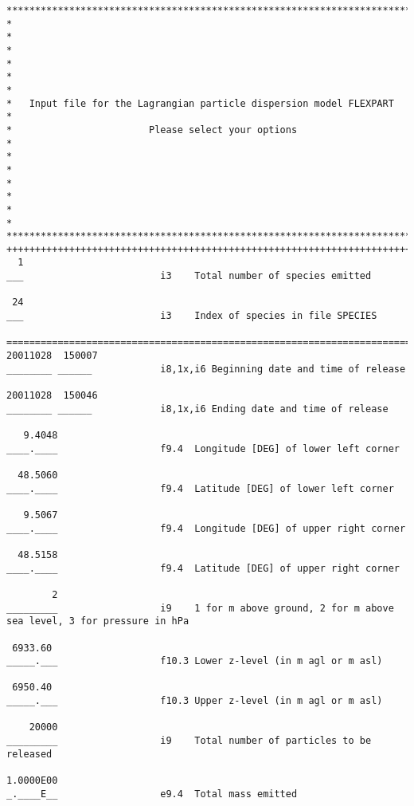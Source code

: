 \documentclass{egu}            %
\begin{document}
\begin{scriptsize}\begin{verbatim}
*************************************************************************
*                                                                       *
*                                                                       *
*                                                                       *
*   Input file for the Lagrangian particle dispersion model FLEXPART    *
*                        Please select your options                     *
*                                                                       *
*                                                                       *
*                                                                       *
*************************************************************************
+++++++++++++++++++++++++++++++++++++++++++++++++++++++++++++++++++++++++
  1      
___                        i3    Total number of species emitted

 24
___                        i3    Index of species in file SPECIES

=========================================================================
20011028  150007
________ ______            i8,1x,i6 Beginning date and time of release

20011028  150046
________ ______            i8,1x,i6 Ending date and time of release

   9.4048 
____.____                  f9.4  Longitude [DEG] of lower left corner

  48.5060
____.____                  f9.4  Latitude [DEG] of lower left corner

   9.5067
____.____                  f9.4  Longitude [DEG] of upper right corner

  48.5158
____.____                  f9.4  Latitude [DEG] of upper right corner

        2
_________                  i9    1 for m above ground, 2 for m above sea level, 3 for pressure in hPa

 6933.60
_____.___                  f10.3 Lower z-level (in m agl or m asl)
 
 6950.40
_____.___                  f10.3 Upper z-level (in m agl or m asl)
 
    20000                
_________                  i9    Total number of particles to be released

1.0000E00
_.____E__                  e9.4  Total mass emitted


\end{verbatim}
\end{scriptsize}
\end{document}
